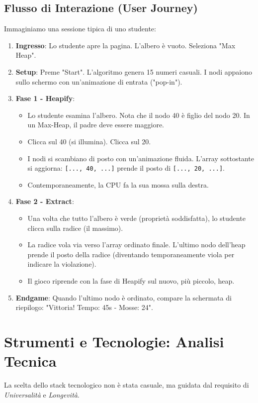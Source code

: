 \documentclass[openany]{theme/uniprthesis}
\begin{document}
\subsection{Flusso di Interazione (User Journey)}
Immaginiamo una sessione tipica di uno studente:
\begin{enumerate}
    \item \textbf{Ingresso}: Lo studente apre la pagina. L'albero è vuoto. Seleziona "Max Heap".
    \item \textbf{Setup}: Preme "Start". L'algoritmo genera 15 numeri casuali. I nodi appaiono sullo schermo con un'animazione di entrata ("pop-in").
    \item \textbf{Fase 1 - Heapify}:
        \begin{itemize}
            \item Lo studente esamina l'albero. Nota che il nodo 40 è figlio del nodo 20. In un Max-Heap, il padre deve essere maggiore.
            \item Clicca sul 40 (si illumina). Clicca sul 20.
            \item I nodi si scambiano di posto con un'animazione fluida. L'array sottostante si aggiorna: \texttt{[..., 40, ...]} prende il posto di \texttt{[..., 20, ...]}.
            \item Contemporaneamente, la CPU fa la sua mossa sulla destra.
        \end{itemize}
    \item \textbf{Fase 2 - Extract}:
        \begin{itemize}
            \item Una volta che tutto l'albero è verde (proprietà soddisfatta), lo studente clicca sulla radice (il massimo).
            \item La radice vola via verso l'array ordinato finale. L'ultimo nodo dell'heap prende il posto della radice (diventando temporaneamente viola per indicare la violazione).
            \item Il gioco riprende con la fase di Heapify sul nuovo, più piccolo, heap.
        \end{itemize}
    \item \textbf{Endgame}: Quando l'ultimo nodo è ordinato, compare la schermata di riepilogo: "Vittoria! Tempo: 45s - Mosse: 24".
\end{enumerate}

\section{Strumenti e Tecnologie: Analisi Tecnica}
La scelta dello stack tecnologico non è stata casuale, ma guidata dal requisito di \textit{Universalità} e \textit{Longevità}.
\end{document}
